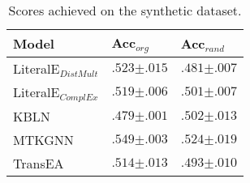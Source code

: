
\begin{table}[]

\setlength{\tabcolsep}{6pt}
\renewcommand{\arraystretch}{1.1}

\caption{Scores achieved on the synthetic dataset.}
\begin{center}

\begin{tabular}{l|l|l}
\hline
Model & Acc$_{org}$                            &  Acc$_{rand}$                            \\ \hline
LiteralE$_{DistMult}$ & $ .523{\scriptstyle \pm.015}$ & $ .481{\scriptstyle \pm.007}$\\ 
LiteralE$_{ComplEx}$ & $ .519{\scriptstyle \pm.006}$ & $ .501{\scriptstyle \pm.007}$\\ 
KBLN & $ .479{\scriptstyle \pm.001}$ & $ .502{\scriptstyle \pm.013}$\\ 
MTKGNN & $ .549{\scriptstyle \pm.003}$ & $ .524{\scriptstyle \pm.019}$\\ 
TransEA & $ .514{\scriptstyle \pm.013}$ & $ .493{\scriptstyle \pm.010}$\\ 

\hline
\end{tabular}

\end{center}
\end{table}
